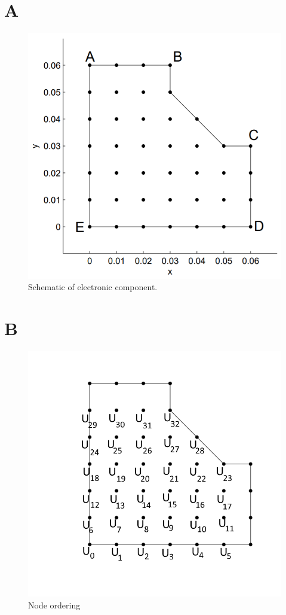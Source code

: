 \documentclass[12pt,a4paper]{article}
\begin{document}
\section*{A}
\begin{figure}[h!]
	\includegraphics[width=\linewidth]{images/Component.png}
	\caption{Schematic of electronic component.}
	\label{fig:componentSchematic2}
\end{figure}

\section*{B}
\begin{figure}[h!]
	\includegraphics[width=\linewidth]{images/ComponentNodesOrdering.png}
	\caption{Node ordering}
	\label{fig:componentNodes}
\end{figure}
\end{document}
